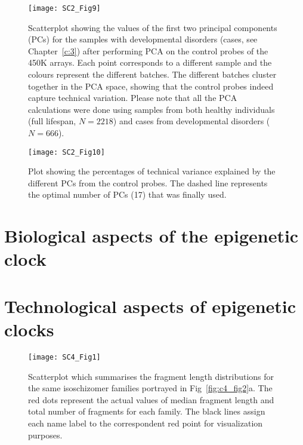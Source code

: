 \begin{figure}[htbp!] 
	\centering    
	\texttt{[image: SC2\_Fig9]}
	\caption[PCA on the array control probes captures batch effects: cases]{Scatterplot showing the values of the first two principal components (PCs) for the samples with developmental disorders (cases, see Chapter~\ref{c:3}) after performing PCA on the control probes of the 450K arrays. Each point corresponds to a different sample and the colours represent the different batches. The different batches cluster together in the PCA space, showing that the control probes indeed capture technical variation. Please note that all the PCA calculations were done using samples from both healthy individuals (full lifespan, $N=2218$) and cases from developmental disorders ($N=666$).}
	\label{fig:sc2_fig9}
\end{figure}

\begin{figure}[htbp!] 
	\vspace*{5mm}
	\centering    
	\texttt{[image: SC2\_Fig10]}
	\caption[Variance explained by the different principal components during batch effect correction]{Plot showing the percentages of technical variance explained by the different PCs from the control probes. The dashed line represents the optimal number of PCs (17) that was finally used.}
	\label{fig:sc2_fig10}
\end{figure}







\clearpage

\renewcommand{\thesection}{S.2}   
\section{Biological aspects of the epigenetic clock}

\renewcommand\thefigure{S2.\arabic{figure}}    
\bigskip

\smallskip

\clearpage

\renewcommand{\thesection}{S.3}   
\section{Technological aspects of epigenetic clocks}

\renewcommand\thefigure{S3.\arabic{figure}}    
\bigskip

\begin{figure}[htbp!] 
	\centering    
	\setcounter{figure}{0}
	\texttt{[image: SC4\_Fig1]}
	\caption[Scatterplot of fragment length distributions for the isoschizomer families]{Scatterplot which summarises the fragment length distributions for the same isoschizomer families portrayed in Fig~\ref{fig:c4_fig2}a. The red dots represent the actual values of median fragment length and total number of fragments for each family. The black lines assign each name label to the correspondent red point for visualization purposes.}
	\label{fig:sc4_fig1}
\end{figure}

